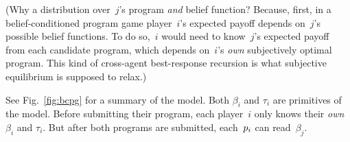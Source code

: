 \documentclass[sigconf]{aamas}
\theoremstyle{definition}
\newcommand{\bcprogspacei}{P^{\mathrm{BC}}_i}
\begin{document}
(Why a distribution over~$j$'s program \textit{and} belief function?
Because, first, in a belief-conditioned program game player~$i$'s expected payoff
depends on~$j$'s possible belief functions.
To do so,~$i$ would need to know~$j$'s expected payoff from each candidate program, which depends on~$i$'s \textit{own} subjectively optimal program. This kind of cross-agent best-response recursion is what subjective equilibrium is supposed to relax.)


See Fig.~\ref{fig:bcpg} for a summary of the model. Both $\beta_i$ and $\tau_i$ are primitives of the model. Before submitting their program, each player~$i$ only knows their \textit{own} $\beta_i$ and $\tau_i$.
But after both programs are submitted, each~$p_i$ can read~$\beta_j$.
\end{document}
